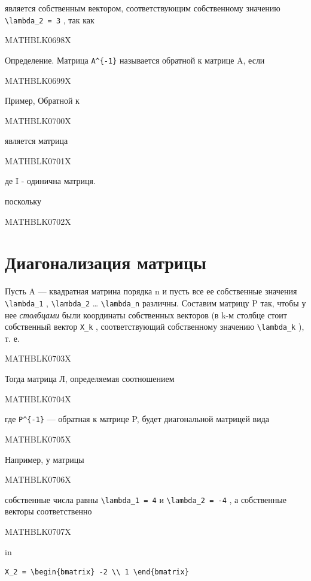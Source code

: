 \documentclass[
  ukrainian,
]{article}
\begin{document}
является собственным вектором, соответствующим собственному значению
\texttt{\textbackslash{}lambda\_2\ =\ 3} , так как

MATHBLK0698X

Определение. Матрица \texttt{A\^{}\{-1\}} называется обратной к матрице
A, если

MATHBLK0699X

Пример, Обратной к

MATHBLK0700X

является матрица

MATHBLK0701X

де I - одинична матриця.

поскольку

MATHBLK0702X

\section{Диагонализация
матрицы}\label{ux434ux438ux430ux433ux43eux43dux430ux43bux438ux437ux430ux446ux438ux44f-ux43cux430ux442ux440ux438ux446ux44b}

Пусть A --- квадратная матрина порядка n и пусть все ее собственные
значения \texttt{\textbackslash{}lambda\_1} ,
\texttt{\textbackslash{}lambda\_2} \ldots{}
\texttt{\textbackslash{}lambda\_n} различны. Составим матрицу P так,
чтобы у нее \emph{столбцами} были координаты собственных векторов (в k-м
столбце стоит собственный вектор \texttt{X\_k} , соответствующий
собственному значению \texttt{\textbackslash{}lambda\_k} ), т. е.

MATHBLK0703X

Тогда матрица Л, определяемая соотношением

MATHBLK0704X

где \texttt{P\^{}\{-1\}} --- обратная к матрице P, будет диагональной
матрицей вида

MATHBLK0705X

Например, у матрицы

MATHBLK0706X

собственные числа равны \texttt{\textbackslash{}lambda\_1\ =\ 4} и
\texttt{\textbackslash{}lambda\_2\ =\ -4} , а собственные векторы
соответственно

MATHBLK0707X

in

\begin{verbatim}
X_2 = \begin{bmatrix} -2 \\ 1 \end{bmatrix}
\end{verbatim}
\end{document}
